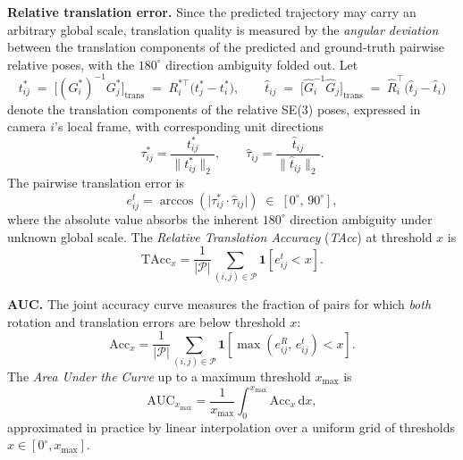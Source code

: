 \documentclass{llmxive}
\begin{document}
\textbf{Relative translation error.}
Since the predicted trajectory may carry an arbitrary global scale, translation quality is measured by the \emph{angular deviation} between the translation components of the predicted and ground-truth pairwise relative poses, with the $180^{\circ}$ direction ambiguity folded out.
%
Let
\begin{equation}
  t_{ij}^{*}\;=\;\bigl[(G_i^{*})^{-1}G_j^{*}\bigr]_{\mathrm{trans}}\;=\;R_i^{*\top}\bigl(t_j^{*}-t_i^{*}\bigr),
  \qquad
  \hat{t}_{ij}\;=\;\bigl[\hat{G}_i^{-1}\hat{G}_j\bigr]_{\mathrm{trans}}\;=\;\hat{R}_i^{\top}\bigl(\hat{t}_j-\hat{t}_i\bigr)
\end{equation}
denote the translation components of the relative SE(3) poses, expressed in camera $i$'s local frame, with corresponding unit directions
\begin{equation}
  \tau_{ij}^{*} = \frac{t_{ij}^{*}}{\|t_{ij}^{*}\|_2},
  \qquad
  \hat{\tau}_{ij} = \frac{\hat{t}_{ij}}{\|\hat{t}_{ij}\|_2}.
\end{equation}
The pairwise translation error is
\begin{equation}
  e^{t}_{ij}
  = \arccos\!\left(\bigl|\tau_{ij}^{*}\cdot\hat{\tau}_{ij}\bigr|\right)
  \;\in\; [0^{\circ},\,90^{\circ}],
  \label{eq:rte}
\end{equation}
where the absolute value absorbs the inherent $180^{\circ}$ direction ambiguity under unknown global scale.
%
The \emph{Relative Translation Accuracy} (\textit{TAcc}) at threshold $x$ is
\begin{equation}
  \mathrm{TAcc}_{x}
  = \frac{1}{|\mathcal{P}|}\sum_{(i,j)\in\mathcal{P}}
    \mathbf{1}\!\left[e^{t}_{ij} < x\right].
  \label{eq:tacc}
\end{equation}

\textbf{AUC.}
The joint accuracy curve measures the fraction of pairs for which \emph{both} rotation and translation errors are below threshold $x$:
\begin{equation}
  \mathrm{Acc}_{x}
  = \frac{1}{|\mathcal{P}|}\sum_{(i,j)\in\mathcal{P}}
    \mathbf{1}\!\left[\max\!\left(e^{R}_{ij},\,e^{t}_{ij}\right) < x\right].
  \label{eq:acc_joint}
\end{equation}
The \emph{Area Under the Curve} up to a maximum threshold $x_{\max}$ is
\begin{equation}
  \mathrm{AUC}_{x_{\max}}
  = \frac{1}{x_{\max}}\int_{0}^{x_{\max}}\mathrm{Acc}_{x}\,\mathrm{d}x,
  \label{eq:auc}
\end{equation}
approximated in practice by linear interpolation over a uniform grid of thresholds $x\in[0^{\circ},x_{\max}]$.
\end{document}
